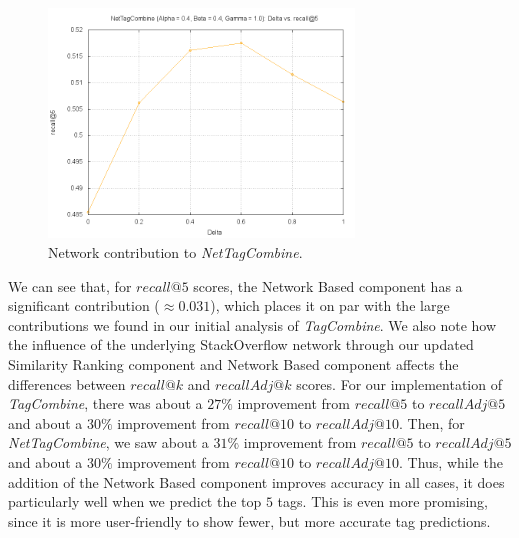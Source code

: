\documentclass[10pt]{IEEEtran}
\begin{document}
\begin{figure}[h]
  \centering
    \includegraphics[width=3.2in]{ntc_delta.png}
  \caption{Network contribution to \textit{NetTagCombine}.}
  \label{fig:ntc_delta}
\end{figure}

We can see that, for $recall@5$ scores, the Network Based component has a significant contribution ($\approx 0.031$), which places it on par with the large contributions we found in our initial analysis of \textit{TagCombine}. We also note how the influence of the underlying StackOverflow network through our updated Similarity Ranking component and Network Based component affects the differences between $recall@k$ and $recallAdj@k$ scores. For our implementation of \textit{TagCombine}, there was about a $27\%$ improvement from $recall@5$ to $recallAdj@5$ and about a $30\%$ improvement from $recall@10$ to $recallAdj@10$. Then, for \textit{NetTagCombine}, we saw about a $31\%$ improvement from $recall@5$ to $recallAdj@5$ and about a $30\%$ improvement from $recall@10$ to $recallAdj@10$. Thus, while the addition of the Network Based component improves accuracy in all cases, it does particularly well when we predict the top $5$ tags. This is even more promising, since it is more user-friendly to show fewer, but more accurate tag predictions.
\end{document}

